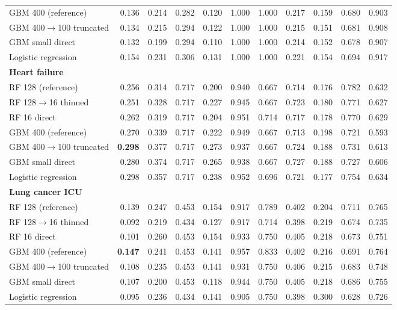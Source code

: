 {\begin{longtable}{lrrrrrrrrrr}
\quad GBM 400 (reference) & 0.136 & 0.214 & 0.282 & 0.120 & 1.000 & 1.000 & 0.217 & 0.159 & 0.680 & 0.903 \\
\quad GBM 400$\rightarrow$100 truncated & 0.134 & 0.215 & 0.294 & 0.122 & 1.000 & 1.000 & 0.215 & 0.151 & 0.681 & 0.908 \\
\quad GBM small direct & 0.132 & 0.199 & 0.294 & 0.110 & 1.000 & 1.000 & 0.214 & 0.152 & 0.678 & 0.907 \\
\quad Logistic regression & 0.154 & 0.231 & 0.306 & 0.131 & 1.000 & 1.000 & 0.221 & 0.154 & 0.694 & 0.917 \\
\midrule
\multicolumn{11}{l}{\textbf{Heart failure}} \\*
\quad RF 128 (reference) & 0.256 & 0.314 & 0.717 & 0.200 & 0.940 & 0.667 & 0.714 & 0.176 & 0.782 & 0.632 \\
\quad RF 128$\rightarrow$16 thinned & 0.251 & 0.328 & 0.717 & 0.227 & 0.945 & 0.667 & 0.723 & 0.180 & 0.771 & 0.627 \\
\quad RF 16 direct & 0.262 & 0.319 & 0.717 & 0.204 & 0.951 & 0.714 & 0.717 & 0.178 & 0.770 & 0.629 \\
\quad GBM 400 (reference) & 0.270 & 0.339 & 0.717 & 0.222 & 0.949 & 0.667 & 0.713 & 0.198 & 0.721 & 0.593 \\
\quad GBM 400$\rightarrow$100 truncated & \textbf{0.298} & 0.377 & 0.717 & 0.273 & 0.937 & 0.667 & 0.724 & 0.188 & 0.731 & 0.613 \\
\quad GBM small direct & 0.280 & 0.374 & 0.717 & 0.265 & 0.938 & 0.667 & 0.727 & 0.188 & 0.727 & 0.606 \\
\quad Logistic regression & 0.298 & 0.357 & 0.717 & 0.238 & 0.952 & 0.696 & 0.721 & 0.177 & 0.754 & 0.634 \\
\midrule
\multicolumn{11}{l}{\textbf{Lung cancer ICU}} \\*
\quad RF 128 (reference) & 0.139 & 0.247 & 0.453 & 0.154 & 0.917 & 0.789 & 0.402 & 0.204 & 0.711 & 0.765 \\
\quad RF 128$\rightarrow$16 thinned & 0.092 & 0.219 & 0.434 & 0.127 & 0.917 & 0.714 & 0.398 & 0.219 & 0.674 & 0.735 \\
\quad RF 16 direct & 0.101 & 0.260 & 0.453 & 0.154 & 0.933 & 0.750 & 0.405 & 0.218 & 0.673 & 0.751 \\
\quad GBM 400 (reference) & \textbf{0.147} & 0.241 & 0.453 & 0.141 & 0.957 & 0.833 & 0.402 & 0.216 & 0.691 & 0.764 \\
\quad GBM 400$\rightarrow$100 truncated & 0.108 & 0.235 & 0.453 & 0.141 & 0.931 & 0.750 & 0.406 & 0.215 & 0.683 & 0.748 \\
\quad GBM small direct & 0.107 & 0.200 & 0.453 & 0.118 & 0.944 & 0.750 & 0.405 & 0.218 & 0.686 & 0.755 \\
\quad Logistic regression & 0.095 & 0.236 & 0.434 & 0.141 & 0.905 & 0.750 & 0.398 & 0.300 & 0.628 & 0.726 \\
\bottomrule
\end{longtable}}
